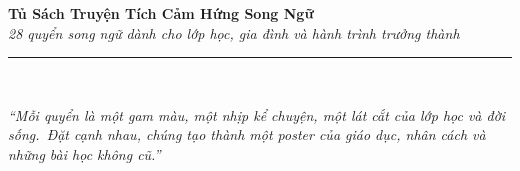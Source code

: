 \begin{center}
{\fontsize{20}{24}\selectfont\bfseries\color{catalogtitle} Tủ Sách Truyện Tích Cảm Hứng Song Ngữ}\\[5pt]
{\normalsize\itshape\color{catalogaccent} 28 quyển song ngữ dành cho lớp học, gia đình và hành trình trưởng thành}\\[8pt]
{\color{catalogline}\rule{0.78\textwidth}{1pt}}\\[8pt]

\begin{tcolorbox}[
  width=0.84\textwidth,
  colback=catalogsoft,
  colframe=catalogframe,
  boxrule=1pt,
  arc=8pt,
  left=10pt,
  right=10pt,
  top=8pt,
  bottom=8pt,
  enhanced
]
{\small\itshape\color{catalogink}
``Mỗi quyển là một gam màu, một nhịp kể chuyện, một lát cắt của lớp học và đời sống.\
Đặt cạnh nhau, chúng tạo thành một poster của giáo dục, nhân cách và những bài học không cũ.''}
\end{tcolorbox}
\end{center}

\vspace{4pt}

